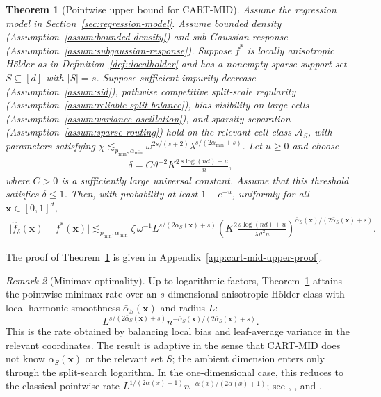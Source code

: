 \documentclass[11pt]{article}
\theoremstyle{plain}
\newtheorem{theorem}{Theorem}[section]
\theoremstyle{definition}
\theoremstyle{remark}
\newtheorem{remark}[theorem]{Remark}
\theoremstyle{plain}
\newcommand{\bx}{\mathbf{x}}
\newcommand{\1}{\mathbbm{1}}
\begin{document}
\begin{theorem}[Pointwise upper bound for CART-MID]
\label{thm:main-thm-point-id-cart}
Assume the regression model in Section~\ref{sec:regression-model}. Assume bounded density (Assumption~\ref{assum:bounded-density}) and sub-Gaussian response (Assumption~\ref{assum:subgaussian-response}). Suppose $f^*$ is locally anisotropic H\"older as in Definition~\ref{def::localholder} and has a nonempty sparse support set $S\subseteq[d]$ with $|S|=s$.
Suppose sufficient impurity decrease (Assumption~\ref{assum:sid}), pathwise competitive split-scale regularity (Assumption~\ref{assum:reliable-split-balance}), bias visibility on large cells (Assumption~\ref{assum:variance-oscillation}), and sparsity separation (Assumption~\ref{assum:sparse-routing}) hold on the relevant cell class $\mathcal A_S$, with parameters satisfying $\chi
\lesssim_{p_{\min},\alpha_{\min}}
\omega^{2s/(s+2)}
\lambda^{s/(2\alpha_{\min}+s)}$. 
Let $u\ge0$ and choose
\begin{align}
\label{equ::deltathm}
\delta
=
C
\vartheta^{-2}
K^2
\frac{s\log(nd)+u}{n},
\end{align}
where $C>0$ is a sufficiently large universal constant. Assume that this threshold satisfies $\delta\le1$.
Then, with probability at least $1-e^{-u}$, uniformly for all $\bx\in[0,1]^d$,
\begin{align}
\label{eq:main-thm-point-eid-cart}
\bigl|\hat f_\delta(\bx)-f^*(\bx)\bigr|
\lesssim_{p_{\min},\alpha_{\min}}
\zeta\,
\omega^{-1}
L^{s/(2\bar\alpha_S(\bx)+s)}
\left(
K^2
\frac{s\log(nd)+u}{\lambda\vartheta^2 n}
\right)^{
\bar\alpha_S(\bx)/(2\bar\alpha_S(\bx)+s)
}.
\end{align}
\end{theorem}

The proof of Theorem~\ref{thm:main-thm-point-id-cart} is given in Appendix~\ref{app:cart-mid-upper-proof}.

\begin{remark}[Minimax optimality]
Up to logarithmic factors, Theorem~\ref{thm:main-thm-point-id-cart} attains the pointwise minimax rate over an $s$-dimensional anisotropic H\"older class with local harmonic smoothness $\bar\alpha_S(\bx)$ and radius $L$:
\[
L^{s/(2\bar\alpha_S(\bx)+s)}
n^{-\bar\alpha_S(\bx)/(2\bar\alpha_S(\bx)+s)}.
\]
This is the rate obtained by balancing local bias and leaf-average variance in the relevant coordinates. The result is adaptive in the sense that CART-MID does not know $\bar\alpha_S(\bx)$ or the relevant set $S$; the ambient dimension enters only through the split-search logarithm. In the one-dimensional case, this reduces to the classical pointwise rate $L^{1/(2\alpha(x)+1)}n^{-\alpha(x)/(2\alpha(x)+1)}$; see \citet{ibragimov1982bounds}, \citet{stone1982optimal}, and \citet{lepski2015adaptive}.
\end{remark}
\end{document}
